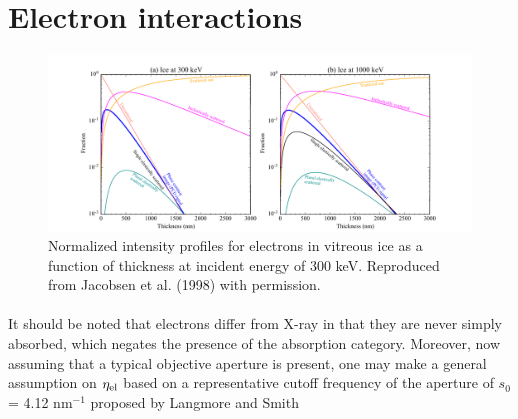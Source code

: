 \documentclass[review]{elsarticle}
\newcommand\el{\textup{\scriptsize{el}}}
\begin{document}
\section{Electron interactions}

\begin{figure}[b!]
\begin{center}
\includegraphics[scale=0.6]{unimatrix_fig_e.pdf}
\caption{Normalized intensity profiles for electrons in vitreous ice as a function of thickness at incident energy of 300 keV. Reproduced from Jacobsen et al. (1998) with permission.}
\label{fig:ice_e_cate}
\end{center}
\end{figure}

\paragraph{} It should be noted that electrons differ from X-ray in that they are never simply absorbed, which negates the presence of the absorption category. Moreover, now assuming that a typical objective aperture is present, one may make a general assumption on $\eta_\el$ based on a representative cutoff frequency of the aperture of $s_0$ = 4.12 $\mathrm{nm}^{-1}$ proposed by Langmore and Smith \cite{Langmore:1992kk}
\end{document}
